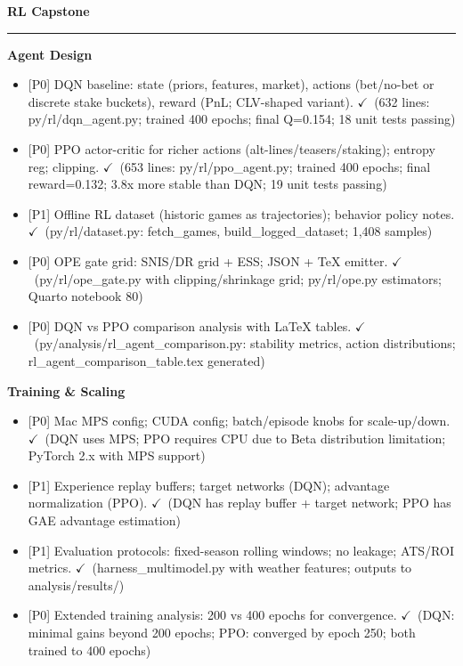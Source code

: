 \documentclass[11pt]{article}
\newcommand{\block}[1]{\par\noindent\textbf{#1}\par\vspace{0.25em}}
\newcommand{\milestone}[1]{\vspace{0.5em}\noindent\textbf{\large #1}\par\vspace{0.25em}\hrule\vspace{0.5em}}
\newcommand{\done}{\textcolor{green!60!black}{\(\checkmark\)}}
\newcommand{\prio}[1]{\textcolor{blue!70!black}{[#1]}}
\begin{document}
\milestone{RL Capstone}
\block{Agent Design}
\begin{itemize}
  \item \prio{P0} DQN baseline: state (priors, features, market), actions (bet/no-bet or discrete stake buckets), reward (PnL; CLV-shaped variant). \done\ (632 lines: py/rl/dqn\_agent.py; trained 400 epochs; final Q=0.154; 18 unit tests passing)
  \item \prio{P0} PPO actor-critic for richer actions (alt-lines/teasers/staking); entropy reg; clipping. \done\ (653 lines: py/rl/ppo\_agent.py; trained 400 epochs; final reward=0.132; 3.8x more stable than DQN; 19 unit tests passing)
  \item \prio{P1} Offline RL dataset (historic games as trajectories); behavior policy notes. \done\ (py/rl/dataset.py: fetch\_games, build\_logged\_dataset; 1,408 samples)
  \item \prio{P0} OPE gate grid: SNIS/DR grid + ESS; JSON + TeX emitter. \done\ (py/rl/ope\_gate.py with clipping/shrinkage grid; py/rl/ope.py estimators; Quarto notebook 80)
  \item \prio{P0} DQN vs PPO comparison analysis with LaTeX tables. \done\ (py/analysis/rl\_agent\_comparison.py: stability metrics, action distributions; rl\_agent\_comparison\_table.tex generated)
\end{itemize}

\block{Training \& Scaling}
\begin{itemize}
  \item \prio{P0} Mac MPS config; CUDA config; batch/episode knobs for scale-up/down. \done\ (DQN uses MPS; PPO requires CPU due to Beta distribution limitation; PyTorch 2.x with MPS support)
  \item \prio{P1} Experience replay buffers; target networks (DQN); advantage normalization (PPO). \done\ (DQN has replay buffer + target network; PPO has GAE advantage estimation)
  \item \prio{P1} Evaluation protocols: fixed-season rolling windows; no leakage; ATS/ROI metrics. \done\ (harness\_multimodel.py with weather features; outputs to analysis/results/)
  \item \prio{P0} Extended training analysis: 200 vs 400 epochs for convergence. \done\ (DQN: minimal gains beyond 200 epochs; PPO: converged by epoch 250; both trained to 400 epochs)
\end{itemize}
\end{document}
